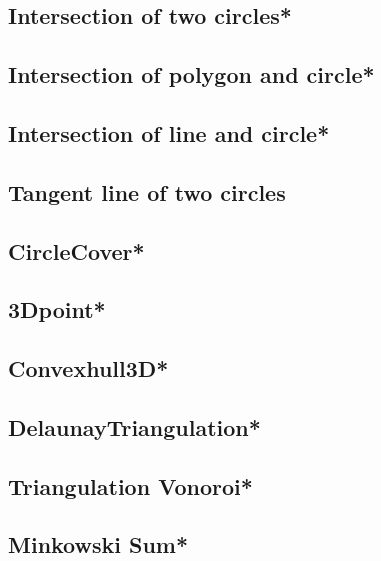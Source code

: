 \subsection{Intersection of two circles*} %

\subsection{Intersection of polygon and circle*} %

\subsection{Intersection of line and circle*} %

\subsection{Tangent line of two circles}

\subsection{CircleCover*} %

\subsection{3Dpoint*} %

\subsection{Convexhull3D*} %

\subsection{DelaunayTriangulation*} %

\subsection{Triangulation Vonoroi*} %

\subsection{Minkowski Sum*} %


